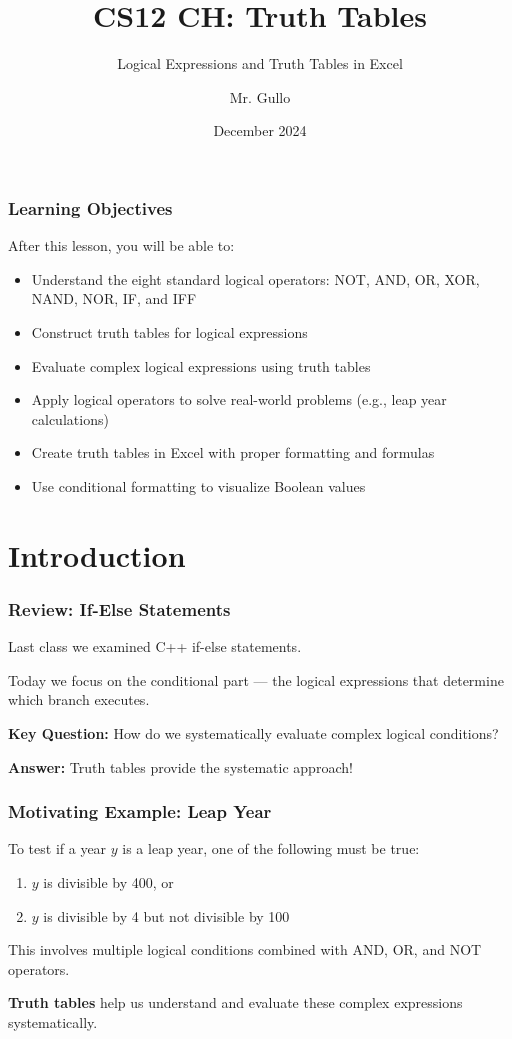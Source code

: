 \documentclass{beamer}
\title[Truth Tables and Logic]{CS12 CH: Truth Tables}
\subtitle{Logical Expressions and Truth Tables in Excel}
\author[Mr. Gullo]{Mr. Gullo}
\date[Dec 2024]{December 2024}
\begin{document}
\frame{\titlepage}

\begin{frame}
\frametitle{Learning Objectives}
After this lesson, you will be able to:
\begin{itemize}
    \item Understand the eight standard logical operators: NOT, AND, OR, XOR, NAND, NOR, IF, and IFF\pause
    \item Construct truth tables for logical expressions\pause
    \item Evaluate complex logical expressions using truth tables\pause
    \item Apply logical operators to solve real-world problems (e.g., leap year calculations)\pause
    \item Create truth tables in Excel with proper formatting and formulas\pause
    \item Use conditional formatting to visualize Boolean values
\end{itemize}
\end{frame}

\section{Introduction}

\begin{frame}
\frametitle{Review: If-Else Statements}
Last class we examined C++ if-else statements.\pause

Today we focus on the \alert{conditional part} --- the logical expressions that determine which branch executes.\pause

\textbf{Key Question:} How do we systematically evaluate complex logical conditions?\pause

\vspace{0.3cm}
\textbf{Answer:} Truth tables provide the systematic approach!
\end{frame}

\begin{frame}
\frametitle{Motivating Example: Leap Year}
To test if a year $y$ is a leap year, one of the following must be true:
\begin{enumerate}
    \item $y$ is divisible by 400, \alert{or}
    \item $y$ is divisible by 4 \alert{but not} divisible by 100
\end{enumerate}\pause

\vspace{0.3cm}
This involves multiple logical conditions combined with AND, OR, and NOT operators.\pause

\vspace{0.3cm}
\textbf{Truth tables} help us understand and evaluate these complex expressions systematically.
\end{frame}
\end{document}
